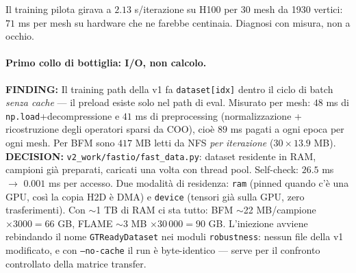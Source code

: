 \documentclass[11pt,a4paper]{article}
\newcommand{\finding}[1]{\textcolor{finding}{\textbf{FINDING:}} #1}
\newcommand{\decision}[1]{\textcolor{decision}{\textbf{DECISION:}} #1}
\begin{document}
Il training pilota girava a $2.13$ s/iterazione su H100 per 30 mesh da 1930 vertici:
$71$ ms per mesh su hardware che ne farebbe centinaia. Diagnosi con misura, non a occhio.

\paragraph{Primo collo di bottiglia: I/O, non calcolo.}
\finding{Il training path della v1 fa \texttt{dataset[idx]} dentro il ciclo di batch
\emph{senza cache} --- il preload esiste solo nel path di eval. Misurato per mesh:
$48$ ms di \texttt{np.load}+decompressione e $41$ ms di preprocessing
(normalizzazione + ricostruzione degli operatori sparsi da COO), cio\`e $89$ ms pagati a
ogni epoca per ogni mesh. Per BFM sono $417$ MB letti da NFS \emph{per iterazione}
($30 \times 13.9$ MB).}
\decision{\texttt{v2\_work/fastio/fast\_data.py}: dataset residente in RAM, campioni
gi\`a preparati, caricati una volta con thread pool. Self-check: $26.5$ ms $\to$
$0.001$ ms per accesso. Due modalit\`a di residenza: \texttt{ram} (pinned quando c'\`e
una GPU, cos\`i la copia H2D \`e DMA) e \texttt{device} (tensori gi\`a sulla GPU, zero
trasferimenti). Con $\sim$1 TB di RAM ci sta tutto: BFM $\sim$22 MB/campione
$\times 3000 = 66$ GB, FLAME $\sim$3 MB $\times 30\,000 = 90$ GB.
L'iniezione avviene rebindando il nome \texttt{GTReadyDataset} nei moduli
\texttt{robustness}: nessun file della v1 modificato, e con \texttt{--no-cache} il run
\`e byte-identico --- serve per il confronto controllato della matrice transfer.}
\end{document}
